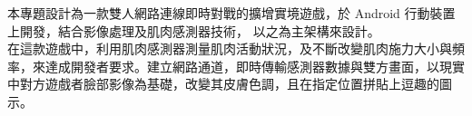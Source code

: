 \documentclass[a0paper,portrait]{baposter}
\begin{document}
\begin{poster}
{本專題設計為一款雙人網路連線即時對戰的擴增實境遊戲，於 Android 行動裝置上開發，結合影像處理及肌肉感測器技術， 以之為主架構來設計。
\\ 在這款遊戲中，利用肌肉感測器測量肌肉活動狀況，及不斷改變肌肉施力大小與頻率，來達成開發者要求。建立網路通道，即時傳輸感測器數據與雙方畫面，以現實中對方遊戲者臉部影像為基礎，改變其皮膚色調，且在指定位置拼貼上逗趣的圖示。
}




\end{poster}
\end{document}
